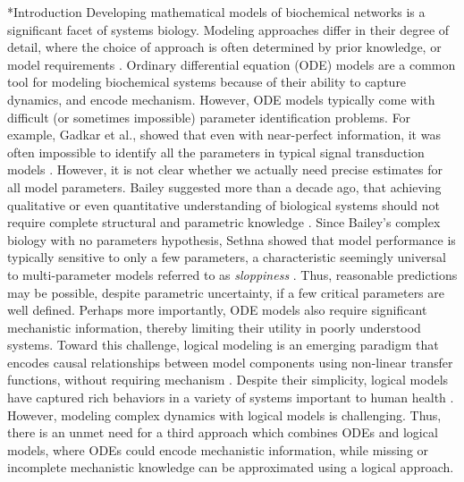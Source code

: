 \documentclass[12pt]{article}
\makeatletter
\renewcommand\section{\@startsection
	{subsection}{2}{0mm}
	{-0.2in}
	{0.05\baselineskip}
	{\normalfont\large\bfseries}}
\makeatother
\begin{document}
\section*{Introduction}
Developing mathematical models of biochemical networks is a significant facet of systems biology.
Modeling approaches differ in their degree of detail, where the choice of approach is often determined by prior knowledge, or model requirements \citep{2012_kholodenko_kolch_SciSig}. 
Ordinary differential equation (ODE) models are a common tool for modeling biochemical systems because of their ability to capture dynamics, and encode mechanism.
However, ODE models typically come with difficult (or sometimes impossible) parameter identification problems. 
For example, Gadkar et al., showed that even with near-perfect information, 
it was often impossible to identify all the parameters in typical signal transduction models \citep{Gadkar:2005ad}. 
However, it is not clear whether we actually need precise estimates for all model parameters. 
Bailey suggested more than a decade ago, that achieving qualitative or even quantitative understanding of biological systems 
should not require complete structural and parametric knowledge \citep{2001_bailey_NatBiotech}. 
Since Bailey's complex biology with no parameters hypothesis, Sethna showed that model performance is typically 
sensitive to only a few parameters, a characteristic seemingly universal to multi-parameter models referred to as \textit{sloppiness} \citep{Machta:2013aa}.
Thus, reasonable predictions may be possible, despite parametric uncertainty, if a few critical parameters are well defined. 
Perhaps more importantly, ODE models also require significant mechanistic information, thereby limiting their utility in poorly understood systems.
Toward this challenge, logical modeling is an emerging paradigm that encodes causal relationships between model components using non-linear transfer functions, 
without requiring mechanism \citep{Morris:2010aa}. 
Despite their simplicity, logical models have captured rich behaviors in a variety of systems important to human health \citep{Saez-Rodriguez:2011aa,Morris:2011ys,Morris:2012aa}. 
However, modeling complex dynamics with logical models is challenging. 
Thus, there is an unmet need for a third approach which combines ODEs and logical models, where ODEs could encode mechanistic information, 
while missing or incomplete mechanistic knowledge can be approximated using a logical approach.  
\end{document}
